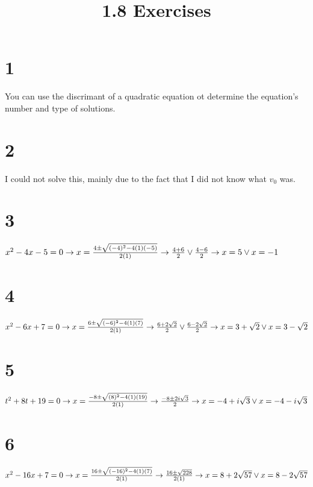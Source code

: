 \documentclass{article}
\title{1.8 Exercises}
\theoremstyle{definition}
\begin{document}
\maketitle

\section*{1}
You can use the discrimant of a quadratic equation ot determine the equation's number and type of solutions.

\section*{2}
I could not solve this, mainly due to the fact that I did not know what $v_0$ was.


\section*{3}
$x^2-4x-5=0\newline\rightarrow x=\frac{4\pm \sqrt{(-4)^2-4(1)(-5)}}{2(1)}\newline\rightarrow \frac{4+6}{2}\vee \frac{4-6}{2}\newline\rightarrow 
x=5\vee x=-1$

\section*{4}
$x^2-6x+7=0\newline\rightarrow x=\frac{6\pm \sqrt{(-6)^2-4(1)(7)}}{2(1)}\newline\rightarrow \frac{6+2\sqrt{2}}{2}\vee \frac{6-2\sqrt{2}}{2}\newline
\rightarrow x=3+\sqrt{2}\vee x=3-\sqrt{2}$

\section*{5}
$t^2+8t+19=0\newline\rightarrow x=\frac{-8\pm \sqrt{(8)^2-4(1)(19)}}{2(1)}\newline\rightarrow \frac{-8\pm 2i\sqrt{3}}{2}\newline\rightarrow 
x=-4+i\sqrt{3}\vee x=-4-i\sqrt{3}$

\section*{6}
$x^2-16x+7=0\newline\rightarrow x=\frac{16\pm\sqrt{(-16)^2-4(1)(7)}}{2(1)}\newline\rightarrow \frac{16\pm \sqrt{228}}{2(1)}\newline\rightarrow 
x=8+2\sqrt{57}\vee x=8-2\sqrt{57}$
\end{document}
